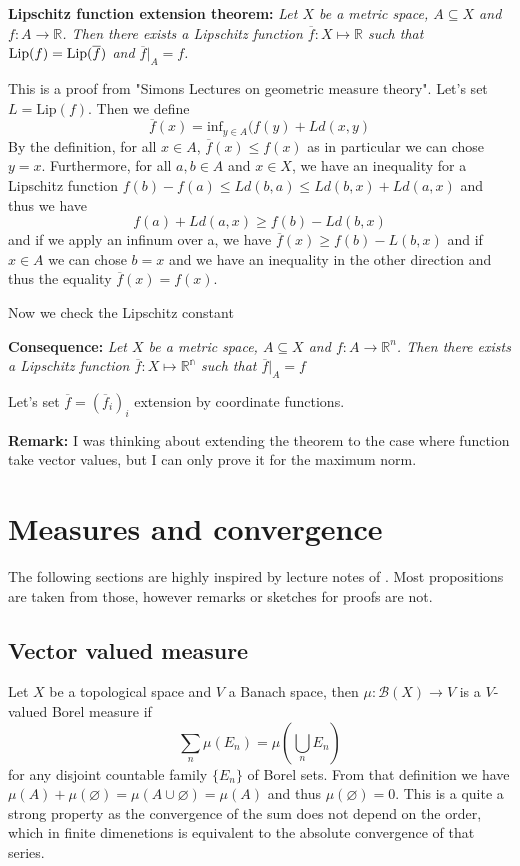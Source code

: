 \documentclass{article}
\begin{document}
\vspace{2ex}
\textbf{Lipschitz function extension theorem:} \textit{Let $X$ be a metric space,
$A\subseteq X$ and $f:A\rightarrow\mathbb{R}$. Then there exists a Lipschitz
function $\overline f:X\mapsto\mathbb{R}$ such that $\textnormal{Lip}(f)=\textnormal{Lip}
(\overline f)$ and $\overline f|_A=f$.}

\vspace{1ex}
This is a proof from "Simons Lectures on geometric measure theory". Let's set
$L=\text{Lip}(f)$. Then we define
\[\overline f(x) = \text{inf}_{y\in A}(f(y)+Ld(x,y)\]
By the definition, for all $x\in A$, $\overline f(x)\leq f(x)$ as in particular
we can chose $y=x$.
Furthermore, for all $a,b\in A$ and $x\in X$, we have an inequality for a
Lipschitz function $f(b)-f(a)\leq Ld(b,a)\leq Ld(b,x)+Ld(a,x)$ and thus we have
\[ f(a)+Ld(a,x)\geq f(b)-Ld(b,x)\] 
and if we apply an infinum over a, we have $\overline f(x)\geq f(b)-L(b,x)$ and
if $x\in A$ we can chose $b=x$ and we have an inequality in the other direction
and thus the equality $\overline f(x)=f(x)$.

\vspace{1ex}
Now we check the Lipschitz constant
%

\vspace{1ex}
\textbf{Consequence:} \textit{Let $X$ be a metric space, $A\subseteq X$ and
$f:A\rightarrow\mathbb{R}^n$. Then there exists a Lipschitz
function $\overline f:X\mapsto\mathbb{R^n}$ such that $\overline f|_A=f$}

\vspace{1ex}
Let's set $\overline f = (\overline f_i)_i$ extension by coordinate functions. 

\vspace{1ex}
\textbf{Remark:} I was thinking about extending the theorem to the case where
function take vector values, but I can only prove it for the maximum norm.

\section{Measures and convergence}

The following sections are highly inspired by lecture notes of \cite{giovanni_alberti}.
Most propositions are taken from those, however remarks or sketches for proofs
are not.

\subsection{Vector valued measure}
Let $X$ be a topological space and $V$ a Banach space, then $\mu:\mathcal{B}(X)
\rightarrow V$ is a $V$-valued Borel measure if
\[\sum_n\mu(E_n)=\mu(\bigcup_n E_n)\]
for any disjoint countable family $\{E_n\}$ of Borel sets. From that definition
we have $\mu(A)+\mu(\varnothing)=\mu(A\cup\varnothing)=\mu(A)$ and thus 
$\mu(\varnothing)=0$. This is a quite a strong property as the convergence of
the sum does not depend on the order, which in finite dimenetions is equivalent
to the absolute convergence of that series.
\end{document}

